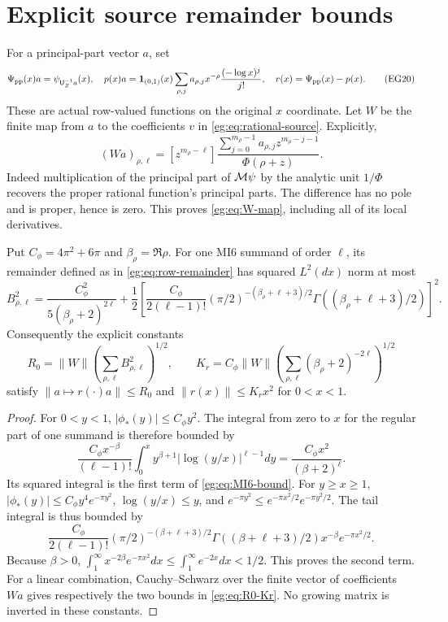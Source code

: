 \documentclass[11pt]{article}
\begin{document}
\section{Explicit source remainder bounds}\label{eg:sec:remainder}
For a principal-part vector $a$, set
\[
 \Psi_{\rm pp}(x)a=\psi_{\mathsf U_Z^{-1}a}(x),\quad
 p(x)a=\mathbf1_{(0,1)}(x)\sum_{\rho,j}a_{\rho,j}
                   x^{-\rho}\frac{(-\log x)^j}{j!},\quad
 r(x)=\Psi_{\rm pp}(x)-p(x).
 \tag{EG20}\label{eg:eq:row-remainder}
\]
These are actual row-valued functions on the original $x$ coordinate.
Let $W$ be the finite map from $a$ to the coefficients $v$ in
\eqref{eg:eq:rational-source}. Explicitly,
\[
 (Wa)_{\rho,\ell}=[z^{m_\rho-\ell}]
 \frac{\sum_{j=0}^{m_\rho-1}a_{\rho,j}z^{m_\rho-j-1}}
                  {\Phi(\rho+z)}.
 \tag{EG21}\label{eg:eq:W-map}
\]
Indeed multiplication of the principal part of $\mathcal M\psi$ by the
analytic unit $1/\Phi$ recovers the proper rational function's
principal parts. The difference has no pole and is proper, hence is
zero. This proves \eqref{eg:eq:W-map}, including all of its local derivatives.

\begin{eglemma}\label{eg:lem:R0}
Put $C_\phi=4\pi^2+6\pi$ and $\beta_\rho=\Re\rho$. For one MI6
summand of order $\ell$, its remainder defined as in
\eqref{eg:eq:row-remainder} has squared $L^2(dx)$ norm at most
\[
 B_{\rho,\ell}^2=
 \frac{C_\phi^2}{5(\beta_\rho+2)^{2\ell}}
 +\frac12\left[
 \frac{C_\phi}{2(\ell-1)!}
 (\pi/2)^{-(\beta_\rho+\ell+3)/2}
 \Gamma((\beta_\rho+\ell+3)/2)\right]^2.
 \tag{EG22}\label{eg:eq:MI6-bound}
\]
Consequently the explicit constants
\[
 R_0=\|W\|\left(\sum_{\rho,\ell}B_{\rho,\ell}^2\right)^{1/2},\qquad
 K_r=C_\phi\|W\|\left(\sum_{\rho,\ell}
                         (\beta_\rho+2)^{-2\ell}\right)^{1/2}
 \tag{EG23}\label{eg:eq:R0-Kr}
\]
satisfy $\|a\mapsto r(\cdot)a\|\le R_0$ and
$\|r(x)\|\le K_rx^2$ for $0<x<1$.
\end{eglemma}
\begin{proof}
For $0<y<1$, $|\phi_*(y)|\le C_\phi y^2$. The integral from zero
to $x$ for the regular part of one summand is therefore bounded by
\[
 \frac{C_\phi x^{-\beta}}{(\ell-1)!}
 \int_0^x y^{\beta+1}|\log(y/x)|^{\ell-1}dy
       =\frac{C_\phi x^2}{(\beta+2)^\ell}.
\]
Its squared integral is the first term of \eqref{eg:eq:MI6-bound}.
For $y\ge x\ge1$, $|\phi_*(y)|\le C_\phi y^4e^{-\pi y^2}$,
$\log(y/x)\le y$, and
$e^{-\pi y^2}\le e^{-\pi x^2/2}e^{-\pi y^2/2}$. The tail integral
is thus bounded by
\[
 \frac{C_\phi}{2(\ell-1)!}
 (\pi/2)^{-(\beta+\ell+3)/2}\Gamma((\beta+\ell+3)/2)
                    x^{-\beta}e^{-\pi x^2/2}.
\]
Because $\beta>0$, $\int_1^\infty x^{-2\beta}e^{-\pi x^2}dx
\le\int_1^\infty e^{-2x}dx<1/2$. This proves the second term.
For a linear combination, Cauchy--Schwarz over the finite vector
of coefficients $Wa$ gives respectively the two bounds in
\eqref{eg:eq:R0-Kr}. No growing matrix is inverted in these constants.
\end{proof}
\end{document}
